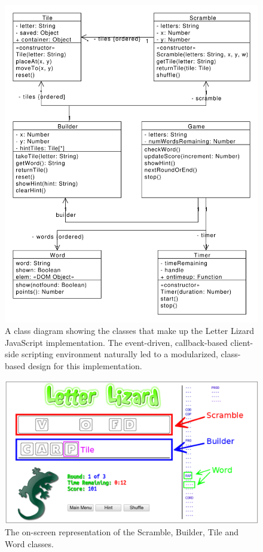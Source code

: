 \begin{figure}
    \centering
	\includegraphics[scale=0.6]{../diagrams/LetterLizardJS-ClassDiagram.pdf}
	\caption[A class diagram for LetterLizardJS]{A class diagram showing the classes that make up the Letter
	Lizard JavaScript implementation. The event-driven, callback-based client-side scripting
	environment naturally led to a modularized, class-based design for this implementation.}
	\label{lljsclasses}
\end{figure}

\begin{figure}
    \centering
	\includegraphics[width=\textwidth]{../screenshots/LetterLizardJS-Legend.png}
	\caption{The on-screen representation of the Scramble, Builder, Tile and Word
	classes.}
	\label{lljslegend}
\end{figure}


